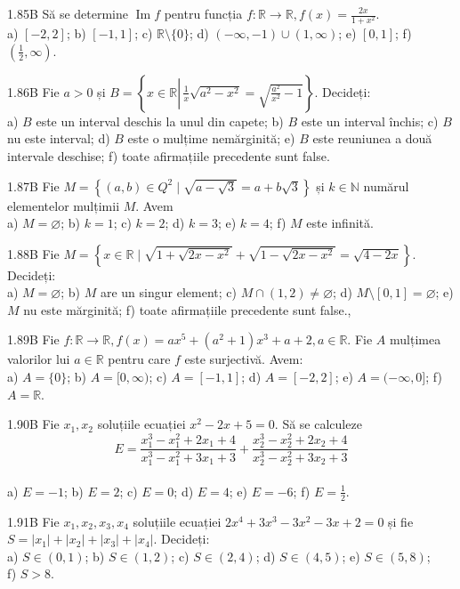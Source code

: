 \documentclass[11pt]{article}
\begin{document}
1.85B Să se determine $\operatorname{Im} f$ pentru funcția $f: \mathbb{R} \rightarrow \mathbb{R}, f(x)=\frac{2 x}{1+x^{2}}$.\\ a) $[-2,2]$; b) $[-1,1]$; c) $\mathbb{R} \setminus\{0\}$; d) $(-\infty,-1) \cup(1, \infty)$; e) $[0,1]$; f) $\left(\frac{1}{2}, \infty\right)$.

1.86B Fie $a>0$ și $B=\left\{x \in \mathbb{R} \left\lvert\, \frac{1}{x} \sqrt{a^{2}-x^{2}}=\sqrt{\frac{a^{2}}{x^{2}}-1}\right.\right\}$. Decideți:\\ a) $B$ este un interval deschis la unul din capete; b) $B$ este un interval închis; c) $B$ nu este interval; d) $B$ este o mulțime nemărginită; e) $B$ este reuniunea a două intervale deschise; f) toate afirmațiile precedente sunt false.

1.87B Fie $M=\left\{(a, b) \in Q^{2} \mid \sqrt{a-\sqrt{3}}=a+b \sqrt{3}\right\}$ și $k \in \mathbb{N}$ numărul elementelor mulțimii $M$. Avem\\ a) $M=\varnothing$; b) $k=1$; c) $k=2$; d) $k=3$; e) $k=4$; f) $M$ este infinită.

1.88B Fie $M=\left\{x \in \mathbb{R} \mid \sqrt{1+\sqrt{2 x-x^{2}}}+\sqrt{1-\sqrt{2 x-x^{2}}}=\sqrt{4-2 x}\right\}$. Decideți:\\ a) $M=\varnothing$; b) $M$ are un singur element; c) $M \cap(1,2) \neq \varnothing$; d) $M \setminus[0,1]=\varnothing$; e) $M$ nu este mărginită; f) toate afirmațiile precedente sunt false.,

1.89B Fie $f: \mathbb{R} \rightarrow \mathbb{R}, f(x)=a x^{5}+\left(a^{2}+1\right) x^{3}+a+2, a \in \mathbb{R}$. Fie $A$ mulțimea valorilor lui $a \in \mathbb{R}$ pentru care $f$ este surjectivă. Avem:\\ a) $A=\{0\}$; b) $A=[0, \infty)$; c) $A=[-1,1]$; d) $A=[-2,2]$; e) $A=(-\infty, 0]$; f) $A=\mathbb{R}$.

1.90B Fie $x_{1}, x_{2}$ soluțiile ecuației $x^{2}-2 x+5=0$. Să se calculeze $$E=\frac{x_{1}^{3}-x_{1}^{2}+2 x_{1}+4}{x_{1}^{3}-x_{1}^{2}+3 x_{1}+3}+\frac{x_{2}^{3}-x_{2}^{2}+2 x_{2}+4}{x_{2}^{3}-x_{2}^{2}+3 x_{2}+3}$$\\ a) $E=-1$; b) $E=2$; c) $E=0$; d) $E=4$; e) $E=-6$; f) $E=\frac{1}{2}$.

1.91B Fie $x_{1}, x_{2}, x_{3}, x_{4}$ soluțiile ecuației $2 x^{4}+3 x^{3}-3 x^{2}-3 x+2=0$ și fie $S=\left|x_{1}\right|+\left|x_{2}\right|+\left|x_{3}\right|+\left|x_{4}\right|$. Decideți:\\ a) $S \in(0,1)$; b) $S \in(1,2)$; c) $S \in(2,4)$; d) $S \in(4,5)$; e) $S \in(5,8)$;\\ f) $S>8$.
\end{document}

